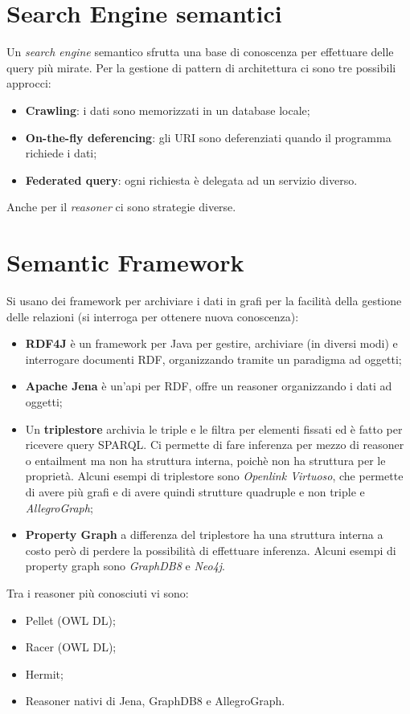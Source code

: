 \documentclass[11pt]{article}
\begin{document}
\section{Search Engine semantici}
Un \textit{search engine} semantico sfrutta una base di conoscenza per effettuare delle query più mirate.
Per la gestione di pattern di architettura ci sono tre possibili approcci:
\begin{itemize}
\item \textbf{Crawling}: i dati sono memorizzati in un database locale;
\item \textbf{On-the-fly deferencing}: gli URI sono deferenziati quando il programma richiede i dati;
\item \textbf{Federated query}: ogni richiesta è delegata ad un servizio diverso.
\end{itemize}
Anche per il \textit{reasoner} ci sono strategie diverse.

\section{Semantic Framework}

Si usano dei framework per archiviare i dati in grafi per la facilità della gestione delle relazioni (si interroga per ottenere nuova conoscenza):
\begin{itemize}
\item \textbf{RDF4J} è un framework per Java per gestire, archiviare (in diversi modi) e interrogare documenti RDF, organizzando tramite un paradigma ad oggetti;
\item \textbf{Apache Jena} è un'api per RDF, offre un reasoner organizzando i dati ad oggetti;
\item Un \textbf{triplestore} archivia le triple e le filtra per elementi fissati ed è fatto per ricevere query SPARQL. Ci permette di fare inferenza per mezzo di reasoner o entailment ma non ha struttura interna, poichè non ha struttura per le proprietà. Alcuni esempi di triplestore sono \textit{Openlink Virtuoso}, che permette di avere più grafi e di avere quindi strutture quadruple e non triple e \textit{AllegroGraph};
\item \textbf{Property Graph} a differenza del triplestore ha una struttura interna a costo però di perdere la possibilità di effettuare inferenza. Alcuni esempi di property graph sono \textit{GraphDB8} e \textit{Neo4j}.
\end{itemize}
Tra i reasoner più conosciuti vi sono:
\begin{itemize}
\item Pellet (OWL DL);
\item Racer (OWL DL);
\item Hermit;
\item Reasoner nativi di Jena, GraphDB8 e AllegroGraph.
\end{itemize}
\end{document}
